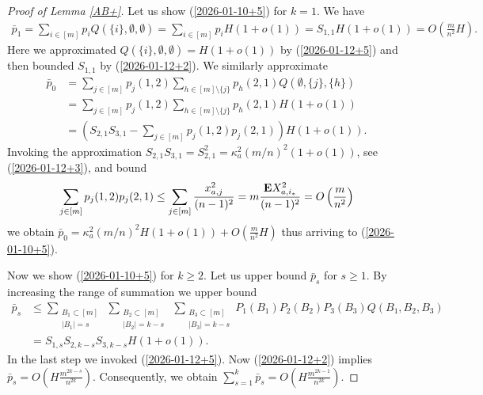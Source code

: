 \documentclass[11pt, a4paper]{article}
\newcommand{\E}{{\bf{E}}}
\begin{document}
\begin{proof}[ Proof of Lemma \ref{AB+}]
Let us show (\ref{2026-01-10+5}) for $k=1$. 
We have
\begin{align*}
{\bar p}_1
=
\sum_{i\in [m]}p_iQ(\{i\},\emptyset,\emptyset)
=
\sum_{i\in [m]}p_iH(1+o(1))
=
S_{1,1}H(1+o(1))
=
O\left(\frac{m}{n^2}H\right).
\end{align*}
Here we approximated $Q(\{i\},\emptyset,\emptyset)
=
H(1+o(1))$ by  (\ref{2026-01-12+5}) 
and then bounded $S_{1,1}$ by  (\ref{2026-01-12+2}).
We similarly approximate
\begin{align*}
{\bar p}_0
&
=
\sum_{j\in[m]}p_j(1,2)\sum_{h\in[m]\setminus\{j\}}p_h(2,1)Q(\emptyset,\{j\},\{h\})
\\
&
=
\sum_{j\in[m]}p_j(1,2)\sum_{h\in[m]\setminus\{j\}}p_h(2,1)H(1+o(1))
\\
&
=
\left(
S_{2,1}
S_{3,1}
-
\sum_{j\in[m]}p_j(1,2)p_j(2,1)
\right)
H(1+o(1)).
\end{align*}
Invoking the approximation $S_{2,1}S_{3,1}=S_{2,1}^2
=\kappa_a^2(m/n)^2(1+o(1))$, see (\ref{2026-01-12+3}), and bound
\begin{align*}
\sum_{j\in[m]}p_j(1,2)p_j(2,1)
\le \sum_{j\in[m]}\frac{x_{a,j}^2}{(n-1)^2}
=
m\frac{\E X_{a,i_*}^2}{(n-1)^2}
=
O\left(\frac{m}{n^2}\right)
\end{align*}
we obtain 
${\bar p}_0
=
\kappa_a^2(m/n)^2H(1+o(1))+O\left(\frac{m}{n^2}H\right)$
thus arriving to  (\ref{2026-01-10+5}).


Now  we show (\ref{2026-01-10+5}) for $k\ge 2$. 
Let us upper bound ${\bar p}_s$ for $s\ge 1$.
By increasing the range of summation we upper bound
\begin{align*}
{\bar p}_s
&
\le
\sum_
{\substack{B_1\subset [m]\\ |B_1|=s}}
\
\sum_{\substack{B_2\subset [m]\\
|B_2|=k-s}}
\
\sum_{\substack{B_3\subset [m]\\
|B_3|=k-s}}
P_1(B_1)P_2(B_2)P_3(B_3)Q(B_1,B_2,B_3)
\\
&
=
S_{1,s}S_{2,k-s}S_{3,k-s}H(
1+o(1)).
\end{align*}
In the last step we invoked (\ref{2026-01-12+5}).
Now (\ref{2026-01-12+2}) implies
${\bar p}_s=O\left(H\frac{m^{2k-s}}{n^{2k}}\right)$. 
Consequently, we obtain 
$\sum_{s=1}^k{\bar p}_s
=O\left(H\frac{m^{2k-1}}{n^{2k}}\right)$.


\end{proof}
\end{document}
